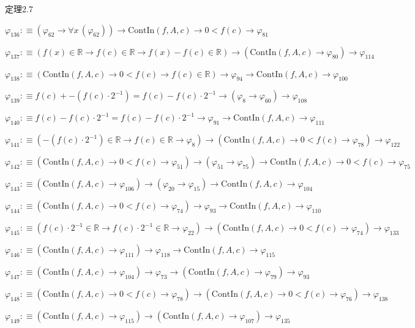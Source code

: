 \begin{fullproof}{定理2.7}
\begin{abbrevlist}
\item $\varphi_{136} :\equiv (\varphi_{62} \to \forall x\,(\varphi_{62})) \to \mathrm{ContIn}(f,A,c) \to 0 < f(c) \to \varphi_{81}$
\item $\varphi_{137} :\equiv (f(x) \in \mathbb{R} \to f(c) \in \mathbb{R} \to f(x) - f(c) \in \mathbb{R}) \to (\mathrm{ContIn}(f,A,c) \to \varphi_{80}) \to \varphi_{114}$
\item $\varphi_{138} :\equiv (\mathrm{ContIn}(f,A,c) \to 0 < f(c) \to f(c) \in \mathbb{R}) \to \varphi_{94} \to \mathrm{ContIn}(f,A,c) \to \varphi_{100}$
\item $\varphi_{139} :\equiv f(c) + -(f(c) \cdot 2^{-1}) = f(c) - f(c) \cdot 2^{-1} \to (\varphi_{8} \to \varphi_{60}) \to \varphi_{108}$
\item $\varphi_{140} :\equiv f(c) - f(c) \cdot 2^{-1} = f(c) - f(c) \cdot 2^{-1} \to \varphi_{91} \to \mathrm{ContIn}(f,A,c) \to \varphi_{111}$
\item $\varphi_{141} :\equiv (-(f(c) \cdot 2^{-1}) \in \mathbb{R} \to f(c) \in \mathbb{R} \to \varphi_{8}) \to (\mathrm{ContIn}(f,A,c) \to 0 < f(c) \to \varphi_{78}) \to \varphi_{122}$
\item $\varphi_{142} :\equiv (\mathrm{ContIn}(f,A,c) \to 0 < f(c) \to \varphi_{51}) \to (\varphi_{51} \to \varphi_{75}) \to \mathrm{ContIn}(f,A,c) \to 0 < f(c) \to \varphi_{75}$
\item $\varphi_{143} :\equiv (\mathrm{ContIn}(f,A,c) \to \varphi_{106}) \to (\varphi_{20} \to \varphi_{15}) \to \mathrm{ContIn}(f,A,c) \to \varphi_{104}$
\item $\varphi_{144} :\equiv (\mathrm{ContIn}(f,A,c) \to 0 < f(c) \to \varphi_{74}) \to \varphi_{93} \to \mathrm{ContIn}(f,A,c) \to \varphi_{110}$
\item $\varphi_{145} :\equiv (f(c) \cdot 2^{-1} \in \mathbb{R} \to f(c) \cdot 2^{-1} \in \mathbb{R} \to \varphi_{22}) \to (\mathrm{ContIn}(f,A,c) \to 0 < f(c) \to \varphi_{74}) \to \varphi_{133}$
\item $\varphi_{146} :\equiv (\mathrm{ContIn}(f,A,c) \to \varphi_{111}) \to \varphi_{118} \to \mathrm{ContIn}(f,A,c) \to \varphi_{115}$
\item $\varphi_{147} :\equiv (\mathrm{ContIn}(f,A,c) \to \varphi_{104}) \to \varphi_{73} \to (\mathrm{ContIn}(f,A,c) \to \varphi_{79}) \to \varphi_{93}$
\item $\varphi_{148} :\equiv (\mathrm{ContIn}(f,A,c) \to 0 < f(c) \to \varphi_{78}) \to (\mathrm{ContIn}(f,A,c) \to 0 < f(c) \to \varphi_{76}) \to \varphi_{138}$
\item $\varphi_{149} :\equiv (\mathrm{ContIn}(f,A,c) \to \varphi_{115}) \to (\mathrm{ContIn}(f,A,c) \to \varphi_{107}) \to \varphi_{135}$

\end{abbrevlist}
\end{fullproof}
